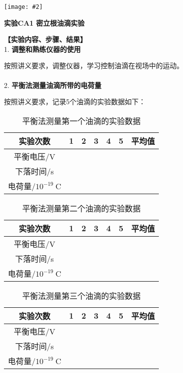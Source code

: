 \documentclass[11pt,a4paper]{ctexart}
\newcommand{\ExpeName}{实验CA1 密立根油滴实验}
\newcommand{\cpic}[2]{
\begin{center}
\texttt{[image: \#2]}
\end{center}
}
\begin{document}
\newpage%
\iffalse
\cpic{0.255}{e2}%
\begin{center}
\LARGE{\textbf{\ExpeName}}
\end{center}
\textbf{【实验内容、步骤、结果】}\\
1. \textbf{调整和熟练仪器的使用}\par
按照讲义要求，调整仪器，学习控制油滴在视场中的运动。
\\
\ 
\\
2. \textbf{平衡法测量油滴所带的电荷量}\par
按照讲义要求，记录5个油滴的实验数据如下：
\begin{table}[h!]
\centering
\caption{平衡法测量第一个油滴的实验数据}
\label{my-label}
\begin{tabular}{|c|p{12mm}|p{12mm}|p{12mm}|p{12mm}|p{12mm}|p{12mm}|}
\hline
实验次数 & 1 & 2 & 3 & 4 & 5 & 平均值 \\ \hline
平衡电压/V &  &  &  &  &  &  \\ \hline
下落时间/s &  &  &  &  &  &  \\ \hline
电荷量/$10^{-19}\mathrm{\ C}$ &  &  &  &  &  &  \\ \hline
\end{tabular}
\end{table}
\begin{table}[h!]
\centering
\caption{平衡法测量第二个油滴的实验数据}
\label{my-label}
\begin{tabular}{|c|p{12mm}|p{12mm}|p{12mm}|p{12mm}|p{12mm}|p{12mm}|}
\hline
实验次数 & 1 & 2 & 3 & 4 & 5 & 平均值 \\ \hline
平衡电压/V &  &  &  &  &  &  \\ \hline
下落时间/s &  &  &  &  &  &  \\ \hline
电荷量/$10^{-19}\mathrm{\ C}$ &  &  &  &  &  &  \\ \hline
\end{tabular}
\end{table}
\begin{table}[h!]
\centering
\caption{平衡法测量第三个油滴的实验数据}
\label{my-label}
\begin{tabular}{|c|p{12mm}|p{12mm}|p{12mm}|p{12mm}|p{12mm}|p{12mm}|}
\hline
实验次数 & 1 & 2 & 3 & 4 & 5 & 平均值 \\ \hline
平衡电压/V &  &  &  &  &  &  \\ \hline
下落时间/s &  &  &  &  &  &  \\ \hline
电荷量/$10^{-19}\mathrm{\ C}$ &  &  &  &  &  &  \\ \hline
\end{tabular}
\end{table}
\end{document}
